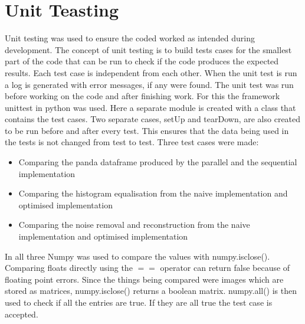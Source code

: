 \section{Unit Teasting}
Unit testing was used to ensure the coded worked as intended during development. The concept of unit testing is to build tests cases for the smallest part of the code that can be run to check if the code produces the expected results. Each test case is independent from each other.  When the unit test is run a log is generated with error messages, if any were found. The unit test was run before working on the code and after finishing work.  For this the framework unittest in python was used.  Here a separate module is created with a class that contains the test cases. Two separate cases, setUp and tearDown, are also created to be run before and after every test. This ensures that the data being used in the tests is not changed from test to test. Three test cases were made:
\begin{itemize}
\item Comparing the panda dataframe produced by the parallel and the sequential implementation
\item Comparing the histogram equalisation from the naive implementation and optimised implementation
\item Comparing the noise removal and reconstruction from the naive implementation and optimised implementation
\end{itemize}
\noindent
In all three Numpy was used to compare the values with numpy.isclose(). Comparing floats directly using the  $==$ operator can return false because of floating point errors. Since the things being compared were images which are stored as matrices, numpy.isclose() returns a boolean matrix. numpy.all() is then used to check if all the entries are true. If they are all true the test case is accepted.